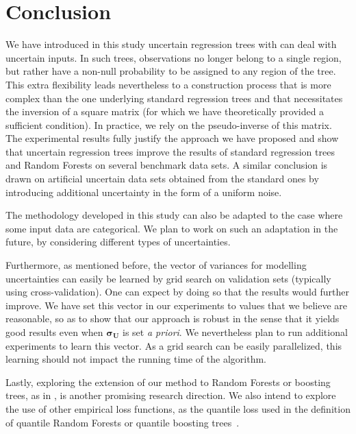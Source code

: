 \documentclass[twoside,11pt]{article}
\begin{document}
\section{Conclusion}
\label{sec:concl}

We have introduced in this study uncertain regression trees with can deal with uncertain inputs. In such trees, observations no longer belong to a single region, but rather have a non-null probability to be assigned to any region of the tree. This extra flexibility leads nevertheless to a construction process that is more complex than the one underlying standard regression trees and that necessitates the inversion of a square matrix (for which we have theoretically provided a sufficient condition). In practice, we rely on the pseudo-inverse of this matrix. The experimental results fully justify the approach we have proposed and show that uncertain regression trees improve the results of standard regression trees and Random Forests on several benchmark data sets. A similar conclusion is drawn on artificial uncertain data sets obtained from the standard ones by introducing additional uncertainty in the form of a uniform noise.

The methodology developed in this study can also be adapted to the case where some input data are categorical. We plan to work on such an adaptation in the future, by considering different types of uncertainties.

Furthermore, as mentioned before, the vector of variances for modelling uncertainties can easily be learned by grid search on validation sets (typically using cross-validation). One can expect by doing so that the results would further improve. We have set this vector in our experiments to values that we believe are reasonable, so as to show that our approach is robust in the sense that it yields good results even when $\boldsymbol{\sigma_U}$ is set \textit{a priori}. We nevertheless plan to run additional experiments to learn this vector. As a grid search can be easily parallelized, this learning should not impact the running time of the algorithm.

Lastly, exploring the extension of our method to Random Forests or boosting trees, as in \cite{freund1999short,Ridgeway2007}, is another promising research direction. We also intend to explore the use of other empirical loss functions, as the quantile loss used in the definition of quantile Random Forests or quantile boosting trees~\cite{fenske2011identifying, kriegler2007boosting, kriegler2010small,meinshausen2006quantile}.


\vskip 0.2in


\end{document}
